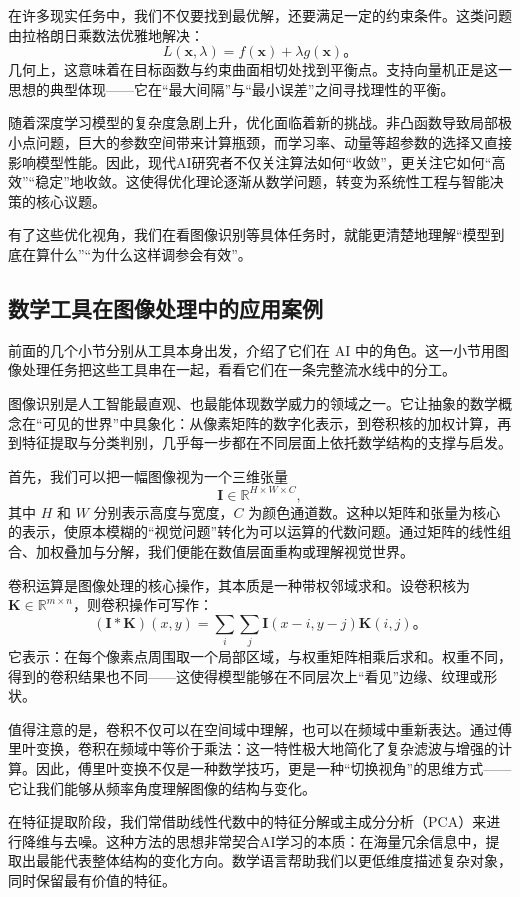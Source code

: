 在许多现实任务中，我们不仅要找到最优解，还要满足一定的约束条件。这类问题由拉格朗日乘数法优雅地解决：
$$
L(\mathbf{x}, \lambda) = f(\mathbf{x}) + \lambda g(\mathbf{x})。
$$
几何上，这意味着在目标函数与约束曲面相切处找到平衡点。支持向量机正是这一思想的典型体现——它在“最大间隔”与“最小误差”之间寻找理性的平衡。

随着深度学习模型的复杂度急剧上升，优化面临着新的挑战。非凸函数导致局部极小点问题，巨大的参数空间带来计算瓶颈，而学习率、动量等超参数的选择又直接影响模型性能。因此，现代AI研究者不仅关注算法如何“收敛”，更关注它如何“高效”“稳定”地收敛。这使得优化理论逐渐从数学问题，转变为系统性工程与智能决策的核心议题。

有了这些优化视角，我们在看图像识别等具体任务时，就能更清楚地理解“模型到底在算什么”“为什么这样调参会有效”。

\subsection{数学工具在图像处理中的应用案例}

前面的几个小节分别从工具本身出发，介绍了它们在 AI 中的角色。这一小节用图像处理任务把这些工具串在一起，看看它们在一条完整流水线中的分工。

图像识别是人工智能最直观、也最能体现数学威力的领域之一。它让抽象的数学概念在“可见的世界”中具象化：从像素矩阵的数字化表示，到卷积核的加权计算，再到特征提取与分类判别，几乎每一步都在不同层面上依托数学结构的支撑与启发。

首先，我们可以把一幅图像视为一个三维张量
$$
\mathbf{I} \in \mathbb{R}^{H \times W \times C},
$$
其中 $H$ 和 $W$ 分别表示高度与宽度，$C$ 为颜色通道数。这种以矩阵和张量为核心的表示，使原本模糊的“视觉问题”转化为可以运算的代数问题。通过矩阵的线性组合、加权叠加与分解，我们便能在数值层面重构或理解视觉世界。

卷积运算是图像处理的核心操作，其本质是一种带权邻域求和。设卷积核为 $\mathbf{K} \in \mathbb{R}^{m \times n}$，则卷积操作可写作：
$$
(\mathbf{I} * \mathbf{K})(x, y) = \sum_i \sum_j \mathbf{I}(x-i, y-j)\mathbf{K}(i, j)。
$$
它表示：在每个像素点周围取一个局部区域，与权重矩阵相乘后求和。权重不同，得到的卷积结果也不同——这使得模型能够在不同层次上“看见”边缘、纹理或形状。

值得注意的是，卷积不仅可以在空间域中理解，也可以在频域中重新表达。通过傅里叶变换，卷积在频域中等价于乘法：这一特性极大地简化了复杂滤波与增强的计算。因此，傅里叶变换不仅是一种数学技巧，更是一种“切换视角”的思维方式——它让我们能够从频率角度理解图像的结构与变化。

在特征提取阶段，我们常借助线性代数中的特征分解或主成分分析（PCA）来进行降维与去噪。这种方法的思想非常契合AI学习的本质：在海量冗余信息中，提取出最能代表整体结构的变化方向。数学语言帮助我们以更低维度描述复杂对象，同时保留最有价值的特征。

